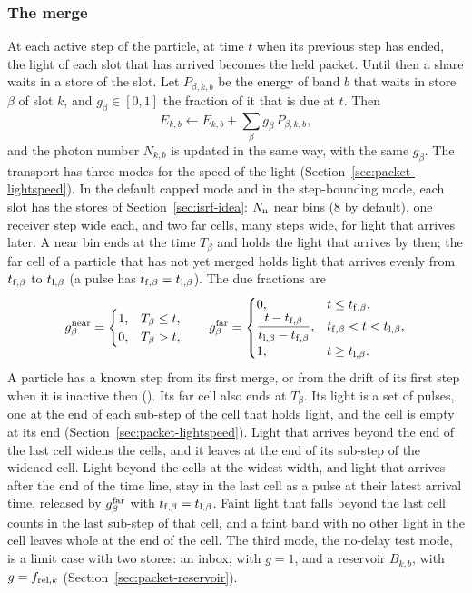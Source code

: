 \subsubsection{The merge}
\label{sec:packet-merge}

At each active step of the particle, at time $t$ when its previous step has
ended, the light of each slot that has arrived becomes the held packet. Until
then a share waits in a store of the slot. Let $P_{\beta,k,b}$ be the energy
of band $b$ that waits in store $\beta$ of slot $k$, and $g_\beta\in[0,1]$
the fraction of it that is due at $t$. Then
\begin{equation}
  E_{k,b} \leftarrow E_{k,b} + \sum_\beta g_\beta\,P_{\beta,k,b},
  \label{eq:packet-merge-E}
\end{equation}
and the photon number $N_{k,b}$ is updated in the same way, with the same
$g_\beta$. The transport has three modes for the speed of the light
(Section~\ref{sec:packet-lightspeed}). In the default capped mode and in the
step-bounding mode, each slot has the stores of Section~\ref{sec:isrf-idea}:
$N_{\rm n}$ near bins (8 by default), one receiver step wide each, and two far
cells, many steps wide, for light that arrives later. A near bin ends at the
time $T_\beta$ and holds the light that arrives by then; the far cell of a
particle that has not yet merged holds light
that arrives evenly from $t_{{\rm f},\beta}$ to $t_{{\rm l},\beta}$ (a pulse
has $t_{{\rm f},\beta}=t_{{\rm l},\beta}$). The due
fractions are
\begin{equation}
  g_\beta^{\rm near}=\begin{cases}1,&T_\beta\le t,\\0,&T_\beta>t,\end{cases}
  \qquad
  g_\beta^{\rm far}=\begin{cases}
    0,& t\le t_{{\rm f},\beta},\\
    \dfrac{t-t_{{\rm f},\beta}}{t_{{\rm l},\beta}-t_{{\rm f},\beta}},
      & t_{{\rm f},\beta}<t<t_{{\rm l},\beta},\\
    1,& t\ge t_{{\rm l},\beta}.
  \end{cases}
  \label{eq:packet-merge-g}
\end{equation}
A particle has a known step from its first merge, or from the drift of its
first step when it is inactive then ().
Its far cell also ends at $T_\beta$. Its light is a set of pulses, one at the
end of each sub-step of the cell that holds light, and the cell is empty at its
end (Section~\ref{sec:packet-lightspeed}). Light that arrives beyond the end of the
last cell widens the cells, and it leaves at the end of its sub-step of the
widened cell. Light beyond the cells at the widest
width, and light that arrives after the end of the time line, stay in the last
cell as a pulse at their latest arrival time, released by $g_\beta^{\rm far}$
with $t_{{\rm f},\beta}=t_{{\rm l},\beta}$. Faint light that falls beyond the
last cell counts in the last sub-step of that cell, and a faint band with no
other light in the cell leaves whole at the end of the cell.
The third mode, the no-delay test mode, is a limit case with two stores: an
inbox, with $g=1$, and a reservoir $B_{k,b}$, with $g=f_{{\rm rel},k}$
(Section~\ref{sec:packet-reservoir}).

